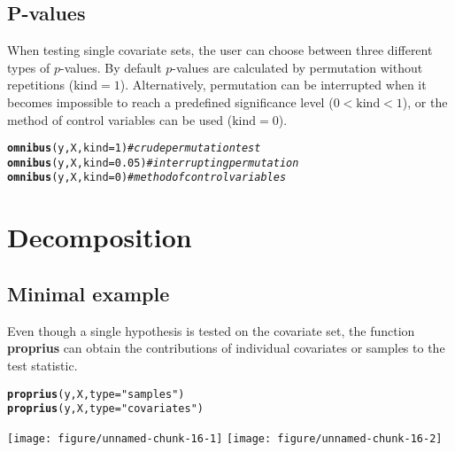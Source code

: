 \documentclass{article}\usepackage[]{graphicx}\usepackage[]{color}
\makeatletter
\def\maxwidth{ %
  \ifdim\Gin@nat@width>\linewidth
    \linewidth
  \else
    \Gin@nat@width
  \fi
}
\newcommand{\hlnum}[1]{\textcolor[rgb]{0.686,0.059,0.569}{#1}}%
\newcommand{\hlstr}[1]{\textcolor[rgb]{0.192,0.494,0.8}{#1}}%
\newcommand{\hlcom}[1]{\textcolor[rgb]{0.678,0.584,0.686}{\textit{#1}}}%
\newcommand{\hlstd}[1]{\textcolor[rgb]{0.345,0.345,0.345}{#1}}%
\newcommand{\hlkwc}[1]{\textcolor[rgb]{0.333,0.667,0.333}{#1}}%
\newcommand{\hlkwd}[1]{\textcolor[rgb]{0.737,0.353,0.396}{\textbf{#1}}}%
\newenvironment{kframe}{%
 \def\at@end@of@kframe{}%
 \ifinner\ifhmode%
  \def\at@end@of@kframe{\end{minipage}}%
  \begin{minipage}{\columnwidth}%
 \fi\fi%
 \def\FrameCommand##1{\hskip\@totalleftmargin \hskip-\fboxsep
 \colorbox{shadecolor}{##1}\hskip-\fboxsep
     \hskip-\linewidth \hskip-\@totalleftmargin \hskip\columnwidth}%
 \MakeFramed {\advance\hsize-\width
   \@totalleftmargin\z@ \linewidth\hsize
   \@setminipage}}%
 {\par\unskip\endMakeFramed%
 \at@end@of@kframe}
\newenvironment{knitrout}{}{} %
\makeatother
\begin{document}
\subsection{P-values}
\label{TOA P-values}

When testing single covariate sets, the user can choose between three different types of \mbox{$p$-values}. By default \mbox{$p$-values} are calculated by permutation without repetitions ($\mathrm{kind}=1$). Alternatively, permutation can be interrupted when it becomes impossible to reach a predefined significance level ($0 < \mathrm{kind} < 1$), or the method of control variables can be used ($\mathrm{kind}=0$).

\begin{knitrout}
\color{fgcolor}\begin{kframe}
\begin{alltt}
\hlkwd{omnibus}\hlstd{(y,X,}\hlkwc{kind}\hlstd{=}\hlnum{1}\hlstd{)} \hlcom{# crude permutation test}
\hlkwd{omnibus}\hlstd{(y,X,}\hlkwc{kind}\hlstd{=}\hlnum{0.05}\hlstd{)} \hlcom{# interrupting permutation}
\hlkwd{omnibus}\hlstd{(y,X,}\hlkwc{kind}\hlstd{=}\hlnum{0}\hlstd{)} \hlcom{# method of control variables}
\end{alltt}
\end{kframe}
\end{knitrout}

\newpage %
\section{Decomposition} %
\label{DCN} %

\subsection{Minimal example}
\label{DCN Minimal example}

Even though a single hypothesis is tested on the covariate set, the function \textbf{proprius} can obtain the contributions of individual covariates or samples to the test statistic. 
\begin{knitrout}
\color{fgcolor}\begin{kframe}
\begin{alltt}
\hlkwd{proprius}\hlstd{(y,X,}\hlkwc{type}\hlstd{=}\hlstr{"samples"}\hlstd{)}
\hlkwd{proprius}\hlstd{(y,X,}\hlkwc{type}\hlstd{=}\hlstr{"covariates"}\hlstd{)}
\end{alltt}
\end{kframe}
\texttt{[image: figure/unnamed-chunk-16-1]} 
\texttt{[image: figure/unnamed-chunk-16-2]} 

\end{knitrout}
\end{document}
